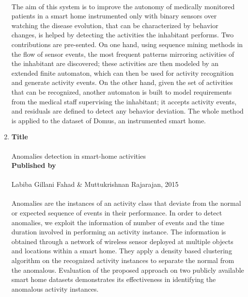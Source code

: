 \begin{enumerate}
			\paragraph{}The aim of this system is to improve the autonomy of medically monitored patients in a smart home instrumented only with binary sensors over watching the disease evolution, that can be characterized by behavior changes, is helped by detecting the activities the inhabitant performs. Two contributions are pre-sented. On one hand, using sequence mining methods in the flow of sensor events, the most frequent patterns mirroring activities of the inhabitant are discovered; these activities are then modeled by an extended finite automaton, which can then be used for activity recognition and generate activity events. On the other hand, given the set of activities that can be recognized, another automaton is built to model requirements from the medical staff supervising the inhabitant; it accepts activity events, and residuals are defined to detect any behavior deviation. The whole method is applied to the dataset of Domus, an instrumented smart home.\\	
					
	\item
		\textbf{Title}
		\paragraph{}Anomalies detection in smart-home activities\\
	
		\textbf{Published by}
			\paragraph{}Labiba Gillani Fahad \& Muttukrishnan Rajarajan, 2015
			\paragraph{}Anomalies are the instances of an activity class that deviate from the normal or expected sequence of events in their performance. In order to detect anomalies, we exploit the information of number of events and the time duration involved in performing an activity instance. The information is obtained through a network of wireless sensor deployed at multiple objects and locations within a smart home. They apply a density based clustering algorithm on the recognized activity instances to separate the normal from the anomalous. Evaluation of the proposed approach on two publicly available smart home datasets demonstrates its effectiveness in identifying the anomalous activity instances.\\


\end{enumerate}
